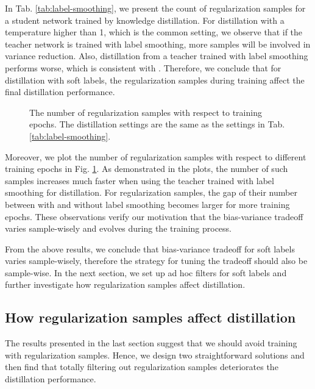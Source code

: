 \documentclass{article} \usepackage{iclr2021_conference,times}
\begin{document}
In Tab. \ref{tab:label-smoothing}, we present the count of regularization samples for a student network trained by knowledge distillation. 
For distillation with a temperature higher than 1, which is the common setting, we observe that if the teacher network is trained with label smoothing, more samples will be involved in variance reduction. 
Also, distillation from a teacher trained with label smoothing performs worse, which is consistent with \citet{muller2019does}.
Therefore, we conclude that for distillation with soft labels, the regularization samples during training affect the final distillation performance. 

\begin{figure}[t]
    \vspace{-20pt}
    \centering
     \quad
     \quad
    \vspace{-3pt}
    \caption{The number of regularization samples with respect to training epochs. The distillation settings are the same as the settings in Tab. \ref{tab:label-smoothing}.}
    \label{fig:num-stage}
\end{figure}

Moreover, we plot the number of regularization samples with respect to different training epochs in Fig. \ref{fig:num-stage}. As demonstrated in the plots, the number of such samples increases much faster when using the teacher trained with label smoothing for distillation. For regularization samples, the gap of their number between with and without label smoothing becomes larger for more training epochs. These observations verify our motivation that the bias-variance tradeoff varies sample-wisely and evolves during the training process.


From the above results, we conclude that bias-variance tradeoff for soft labels varies sample-wisely, therefore the strategy for tuning the tradeoff should also be sample-wise.
In the next section, we set up ad hoc filters for soft labels and further investigate how regularization samples affect distillation.



\vspace{-5pt}
\subsection{How regularization samples affect distillation}
The results presented in the last section suggest that we should avoid training with regularization samples. 
Hence, we design two straightforward solutions and then find that totally filtering out regularization samples deteriorates the distillation performance. 
\end{document}
